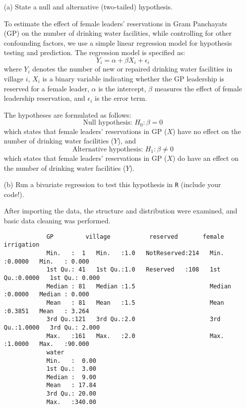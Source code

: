 \documentclass[12pt,letterpaper]{article}
\begin{document}
	\begin{enumerate}
		\item [(a)] State a null and alternative (two-tailed) hypothesis.
		
		To estimate the effect of female leaders' reservations in Gram Panchayats (GP) on the number of drinking water facilities, while controlling for other confounding factors, we use a simple linear regression model for hypothesis testing and prediction. The regression model is specified as:
		\[
		Y_i = \alpha + \beta X_i + \epsilon_i
		\]
		where $Y_i$ denotes the number of new or repaired drinking water facilities in village $i$, $X_i$ is a binary variable indicating whether the GP leadership is reserved for a female leader, $\alpha$ is the intercept, $\beta$ measures the effect of female leadership reservation, and $\epsilon_i$ is the error term.
		
		The hypotheses are formulated as follows:
		\[
		\text{Null hypothesis: } H_0: \beta = 0
		\]
		which states that female leaders' reservations in GP ($X$) have no effect on the number of drinking water facilities ($Y$), and
		\[
		\text{Alternative hypothesis: } H_1: \beta \neq 0
		\]
		which states that female leaders' reservations in GP ($X$) do have an effect on the number of drinking water facilities ($Y$).
		
		\item [(b)] Run a bivariate regression to test this hypothesis in \texttt{R} (include your code!).
		
		After importing the data, the structure and distribution were examined, and basic data cleaning was performed. \\
		
		\begin{verbatim}
			GP         village           reserved       female         irrigation    
			Min.   :  1   Min.   :1.0   NotReserved:214   Min.   :0.0000   Min.   : 0.000  
			1st Qu.: 41   1st Qu.:1.0   Reserved   :108   1st Qu.:0.0000   1st Qu.: 0.000  
			Median : 81   Median :1.5                     Median :0.0000   Median : 0.000  
			Mean   : 81   Mean   :1.5                     Mean   :0.3851   Mean   : 3.264  
			3rd Qu.:121   3rd Qu.:2.0                     3rd Qu.:1.0000   3rd Qu.: 2.000  
			Max.   :161   Max.   :2.0                     Max.   :1.0000   Max.   :90.000  
			water       
			Min.   :  0.00  
			1st Qu.:  3.00  
			Median :  9.00  
			Mean   : 17.84  
			3rd Qu.: 20.00  
			Max.   :340.00  
		\end{verbatim}
		

\end{enumerate}
\end{document}
